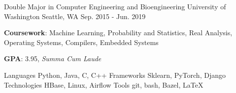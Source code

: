 \begin{multicols}{2}
\begin{cventries}
  \cventry
    {Double Major in Computer Engineering and Bioengineering}
    {University of Washington}
    {Seattle, WA}
    {Sep. 2015 - Jun. 2019}
    {
      \begin{cvitems}
	\item {\textbf{Coursework}: Machine Learning, Probability and Statistics, Real Analysis, Operating Systems, Compilers, Embedded Systems}
	\item {\textbf{GPA}: 3.95, \textit{Summa Cum Laude}}
      \end{cvitems}
    }
    \vspace{-1.0em}
\end{cventries}

	\vspace{-2.1em}
	\begin{cvskills}
		\cvskill
			{Languages}
			{Python, Java, C, C++}
		\cvskill
			{Frameworks}
			{Sklearn, PyTorch, Django}
        \cvskill
            {Technologies}
            {HBase, Linux, Airflow}
		\cvskill
			{Tools}
			{git, bash, Bazel, \LaTeX}
	\end{cvskills}
    \vspace{-4em}
\end{multicols}
    \vspace{-1.5em}

